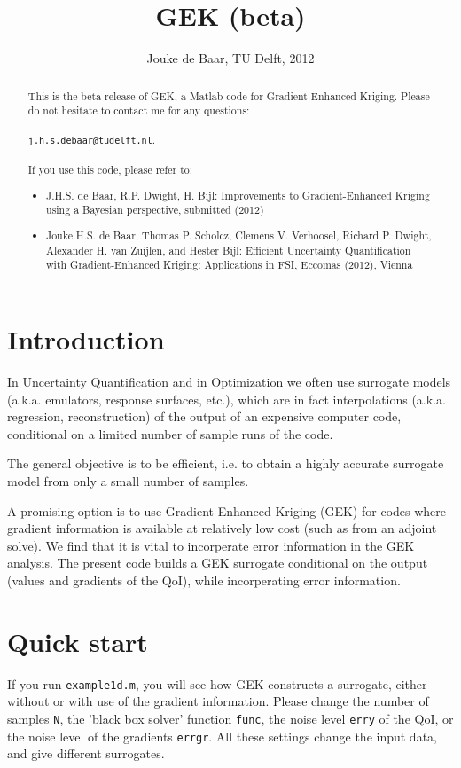 \documentclass[a4paper,10pt]{article}
\title{GEK (beta)}
\author{Jouke de Baar, TU Delft, 2012}
\begin{document}
\maketitle

\begin{abstract}
This is the beta release of GEK, a Matlab code for Gradient-Enhanced Kriging. Please do not hesitate to contact me for any questions: \\ \\ \texttt{j.h.s.debaar@tudelft.nl}. \\ \\

If you use this code, please refer to:

\begin{itemize}
\item J.H.S. de Baar, R.P. Dwight, H. Bijl: Improvements to Gradient-Enhanced Kriging using a Bayesian perspective, submitted (2012)
\item Jouke H.S. de Baar, Thomas P. Scholcz, Clemens V. Verhoosel, Richard P. Dwight, Alexander H. van Zuijlen, and Hester Bijl: Efficient Uncertainty Quantification with Gradient-Enhanced Kriging: Applications in FSI, Eccomas (2012), Vienna
\end{itemize}

\end{abstract}

\section{Introduction}
In Uncertainty Quantification and in Optimization we often use surrogate models (a.k.a. emulators, response surfaces, etc.), which are in fact interpolations (a.k.a. regression, reconstruction) of the output of an expensive computer code, conditional on a limited number of sample runs of the code.

The general objective is to be efficient, i.e. to obtain a highly accurate surrogate model from only a small number of samples.

A promising option is to use Gradient-Enhanced Kriging (GEK) for codes where gradient information is available at relatively low cost (such as from an adjoint solve). We find that it is vital to incorperate error information in the GEK analysis. The present code builds a GEK surrogate conditional on the output (values and gradients of the QoI), while incorperating error information. 

\section{Quick start}
If you run \texttt{example1d.m}, you will see how GEK constructs a surrogate, either without or with use of the gradient information. Please change the number of samples \texttt{N}, the 'black box solver' function \texttt{func}, the noise level \texttt{erry} of the QoI, or the noise level of the gradients \texttt{errgr}. All these settings change the input data, and give different surrogates.
\end{document}
